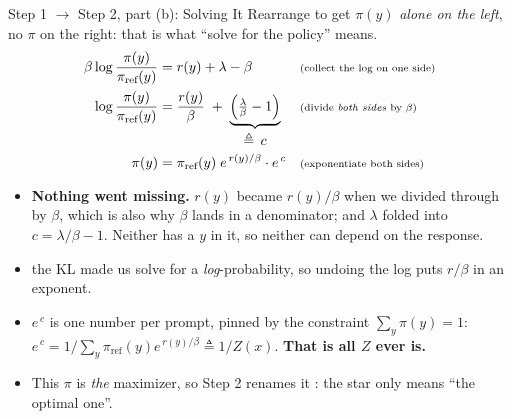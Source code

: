 \begin{frame}{Step 1 $\rightarrow$ Step 2, part (b): Solving It}
Rearrange to get $\pi(y)$ \emph{alone on the left}, no $\pi$ on the right: that
is what ``solve for the policy'' means.
\begin{align*}
    \beta\log\frac{\pi(y)}{\pi_{\text{ref}}(y)} &= r(y) + \lambda - \beta
        && \text{\scriptsize(collect the log on one side)}\\[0.05em]
    \log\frac{\pi(y)}{\pi_{\text{ref}}(y)} &= \frac{r(y)}{\beta}
        \;+\; \underbrace{\Big(\tfrac{\lambda}{\beta} - 1\Big)}_{\textstyle \triangleq\, c}
        && \text{\scriptsize(divide \emph{both sides} by $\beta$)}\\[0.05em]
    \pi(y) &= \pi_{\text{ref}}(y)\; e^{\,r(y)/\beta}\cdot e^{\,c}
        && \text{\scriptsize(exponentiate both sides)}
\end{align*}
\vspace{-1.6em}
\begin{itemize}\itemsep0.1em\footnotesize
    \item \textbf{Nothing went missing.} $r(y)$ became $r(y)/\beta$ when we divided
          through by $\beta$, which is also why $\beta$ lands in a denominator; and
          $\lambda$ folded into $c=\lambda/\beta-1$. Neither has a $y$ in it, so
          neither can depend on the response.
    \item {} the KL made us solve for a
          \emph{log}-probability, so undoing the log puts $r/\beta$ in an exponent.
    \item $e^{\,c}$ is one number per prompt, pinned by the constraint
          $\sum_y\pi(y)=1$:
          $e^{\,c} = 1/\sum_y \pi_{\text{ref}}(y)e^{\,r(y)/\beta} \triangleq 1/Z(x)$.
          \textbf{That is all $Z$ ever is.}
    \item This $\pi$ is \emph{the} maximizer, so Step 2 renames it
          \empr{$\pi^\star$}: the star only means ``the optimal one''.
\end{itemize}
\end{frame}

